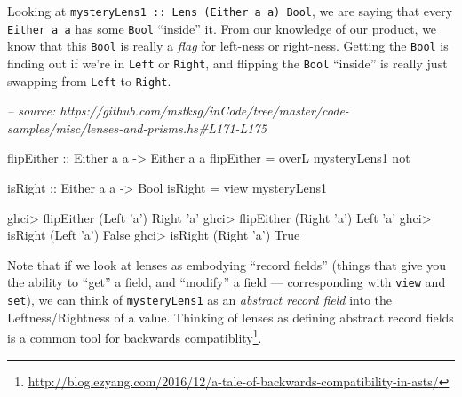 \documentclass[]{article}
\newenvironment{Shaded}{}{}
\newcommand{\CharTok}[1]{\textcolor[rgb]{0.25,0.44,0.63}{#1}}
\newcommand{\CommentTok}[1]{\textcolor[rgb]{0.38,0.63,0.69}{\textit{#1}}}
\newcommand{\DataTypeTok}[1]{\textcolor[rgb]{0.56,0.13,0.00}{#1}}
\newcommand{\FunctionTok}[1]{\textcolor[rgb]{0.02,0.16,0.49}{#1}}
\newcommand{\NormalTok}[1]{#1}
\newcommand{\OtherTok}[1]{\textcolor[rgb]{0.00,0.44,0.13}{#1}}
\renewcommand{\href}[2]{#2\footnote{\url{#1}}}
\begin{document}
Looking at
\texttt{mysteryLens1\ ::\ Lens\textquotesingle{}\ (Either\ a\ a)\ Bool}, we are
saying that every \texttt{Either\ a\ a} has some \texttt{Bool} ``inside'' it.
From our knowledge of our product, we know that this \texttt{Bool} is really a
\emph{flag} for left-ness or right-ness. Getting the \texttt{Bool} is finding
out if we're in \texttt{Left} or \texttt{Right}, and flipping the \texttt{Bool}
``inside'' is really just swapping from \texttt{Left} to \texttt{Right}.

\begin{Shaded}
\begin{Highlighting}[]
\CommentTok{-- source: https://github.com/mstksg/inCode/tree/master/code-samples/misc/lenses-and-prisms.hs#L171-L175}

\OtherTok{flipEither ::} \DataTypeTok{Either}\NormalTok{ a a }\OtherTok{->} \DataTypeTok{Either}\NormalTok{ a a}
\NormalTok{flipEither }\FunctionTok{=}\NormalTok{ overL mysteryLens1 not}

\OtherTok{isRight ::} \DataTypeTok{Either}\NormalTok{ a a }\OtherTok{->} \DataTypeTok{Bool}
\NormalTok{isRight }\FunctionTok{=}\NormalTok{ view mysteryLens1}
\end{Highlighting}
\end{Shaded}

\begin{Shaded}
\begin{Highlighting}[]
\NormalTok{ghci}\FunctionTok{>}\NormalTok{ flipEither (}\DataTypeTok{Left} \CharTok{'a'}\NormalTok{)}
\DataTypeTok{Right} \CharTok{'a'}
\NormalTok{ghci}\FunctionTok{>}\NormalTok{ flipEither (}\DataTypeTok{Right} \CharTok{'a'}\NormalTok{)}
\DataTypeTok{Left} \CharTok{'a'}
\NormalTok{ghci}\FunctionTok{>}\NormalTok{ isRight (}\DataTypeTok{Left} \CharTok{'a'}\NormalTok{)}
\DataTypeTok{False}
\NormalTok{ghci}\FunctionTok{>}\NormalTok{ isRight (}\DataTypeTok{Right} \CharTok{'a'}\NormalTok{)}
\DataTypeTok{True}
\end{Highlighting}
\end{Shaded}

Note that if we look at lenses as embodying ``record fields'' (things that give
you the ability to ``get'' a field, and ``modify'' a field --- corresponding
with \texttt{view} and \texttt{set}), we can think of \texttt{mysteryLens1} as
an \emph{abstract record field} into the Leftness/Rightness of a value. Thinking
of lenses as defining abstract record fields is a
\href{http://blog.ezyang.com/2016/12/a-tale-of-backwards-compatibility-in-asts/}{common
tool for backwards compatiblity}.
\end{document}

